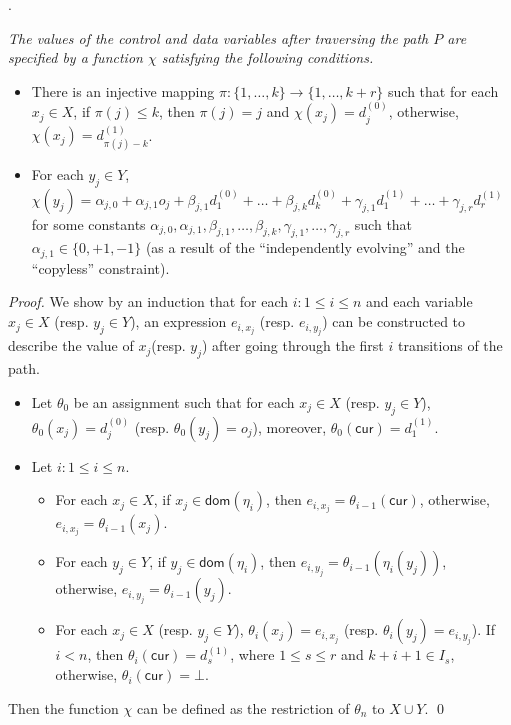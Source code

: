 \documentclass[runningheads,a4paper]{llncs}
\newcommand\cur{\mathsf{cur}}
\newcommand\dom{\mathsf{dom}}
\begin{document}
\begin{appendix}
.
{\it The values of the control and data variables after traversing the path $P$ are specified by a function $\chi$ satisfying the following conditions.
\begin{itemize}
\item There is an injective mapping $\pi: \{1,\dots,k\} \rightarrow \{1,\dots, k+r\}$ such that for each $x_j \in X$, if $\pi(j) \le k$, then $\pi(j)=j$ and $\chi(x_j)=d^{(0)}_{j}$, otherwise, $\chi(x_j)=d^{(1)}_{\pi(j)-k}$.
% 
\item For each $y_j \in Y$, $\chi(y_j) = \alpha_{j,0} + \alpha_{j,1} o_j + \beta_{j,1} d^{(0)}_1 + \dots + \beta_{j,k} d^{(0)}_k + \gamma_{j,1} d^{(1)}_1 +\dots + \gamma_{j,r} d^{(1)}_{r}$ for some constants $\alpha_{j,0},\alpha_{j,1}, \beta_{j,1},\dots,\beta_{j,k}, \gamma_{j,1},\dots,\gamma_{j,r}$ such that $\alpha_{j,1} \in \{0,+1,-1\}$ (as a result of the ``independently evolving'' and the ``copyless'' constraint).
\end{itemize}
}

\begin{proof}
We show by an induction that for each $i: 1 \le i \le n$ and each variable $x_j \in X$ (resp. $y_j \in Y$), an expression $e_{i,x_j}$ (resp. $e_{i,y_j}$) can be constructed to describe the value of $x_j$(resp. $y_j$) after going through the first $i$ transitions of the path. 
%
\begin{itemize}
\item Let $\theta_0$ be an assignment such that for each $x_j \in X$ (resp. $y_j \in Y$), $\theta_0(x_j)=d^{(0)}_j$ (resp. $\theta_0(y_j)=o_j$), moreover, $\theta_0(\cur)=d^{(1)}_1$.
%
%
\item Let $i: 1 \le i \le n$. 
\begin{itemize}
\item For each $x_j \in X$, if $x_j \in \dom(\eta_i)$, then $e_{i,x_j}=\theta_{i-1}(\cur)$, otherwise, $e_{i,x_j}=\theta_{i-1}(x_j)$.
%
\item For each $y_j \in Y$, if $y_j \in \dom(\eta_i)$, then $e_{i,y_j} = \theta_{i-1}(\eta_i(y_j))$, otherwise, $e_{i,y_j}=\theta_{i-1}(y_j)$.
%
\item For each $x_{j} \in X$ (resp. $y_j \in Y$), $\theta_i(x_{j})=e_{i,x_{j}}$ (resp. $\theta_i(y_{j})=e_{i, y_{j}}$). If $i < n$, then $\theta_i(\cur)=d^{(1)}_{s}$, where $1\le s \le r$ and $k+i + 1 \in I_s$, otherwise, $\theta_i(\cur)=\bot$.
\end{itemize}
\end{itemize}
Then the function $\chi$ can be defined as the restriction of $\theta_n$ to $X \cup Y$.
\qed
\end{proof}



\end{appendix}
\end{document}
